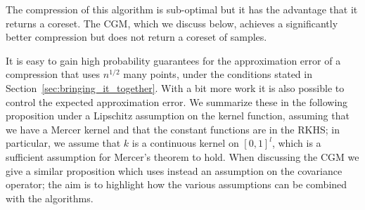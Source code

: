 \documentclass[10pt]{amsart}
\theoremstyle{definition}\newtheorem{defi}[theo]{Definition}\newtheorem{rema}[theo]{Remark}\newtheorem{exam}[theo]{Example}\newtheorem{exem}[theo]{Example}\newtheorem{nota}[theo]{Notation}
\theoremstyle{remark}
\begin{document}
The compression of this algorithm is sub-optimal but it has the advantage that it returns a coreset. The CGM, which we discuss below, achieves a significantly better compression but does not return a coreset of samples.


It is easy to gain high probability guarantees for the approximation error of a compression that uses $n^{1/2}$ many points, under the conditions stated in Section~\ref{sec:bringing_it_together}. With a bit more work it is also possible to control the expected approximation error. We summarize these in the following proposition under a Lipschitz assumption on the kernel function, assuming that we have a Mercer kernel and that the constant functions are in the RKHS; in particular, we assume that $k$ is a continuous kernel on $[0,1]^l$, which is a sufficient assumption for Mercer's theorem to hold. When discussing the CGM we give a similar proposition which uses instead an assumption on the covariance operator; the aim is to highlight how the various assumptions can be combined with the algorithms.
\end{document}
